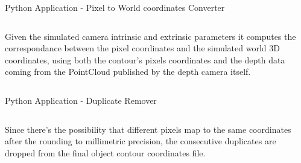 \begin{frame}{Python Application - Pixel to World coordinates Converter}
    \begin{columns}
        \begin{column}{.35\linewidth}
            Given the simulated camera intrinsic and extrinsic parameters it computes the correspondance between the pixel coordinates and the simulated world 3D coordinates, using both the contour's pixels coordinates and the depth data coming from the PointCloud published by the depth camera itself.
        \end{column}
    \end{columns}
\end{frame}
\begin{frame}{Python Application - Duplicate Remover}
    \begin{columns}
        \begin{column}{.50\linewidth}
            Since there's the possibility that different pixels map to the same coordinates after the rounding to millimetric precision, the consecutive duplicates are dropped from the final object contour coordinates file.
        \end{column}
    \end{columns}
\end{frame}
